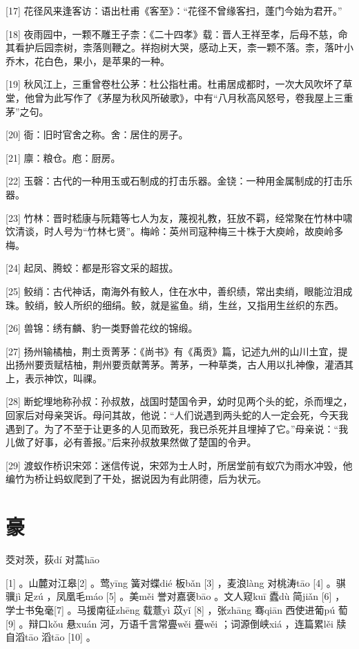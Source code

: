 \documentclass[12pt,UTF8]{ctexbook}
\begin{document}
[17] 花径风来逢客访：语出杜甫《客至》：“花径不曾缘客扫，蓬门今始为君开。”

[18] 夜雨园中，一颗不雕王子柰：《二十四孝》载：晋人王祥至孝，后母不慈，命其看护后园柰树，柰落则鞭之。祥抱树大哭，感动上天，柰一颗不落。柰，落叶小乔木，花白色，果小，是苹果的一种。

[19] 秋风江上，三重曾卷杜公茅：杜公指杜甫。杜甫居成都时，一次大风吹坏了草堂，他曾为此写作了《茅屋为秋风所破歌》，中有“八月秋高风怒号，卷我屋上三重茅”之句。

[20] 衙：旧时官舍之称。舍：居住的房子。

[21] 廪：粮仓。庖：厨房。

[22] 玉磬：古代的一种用玉或石制成的打击乐器。金铙：一种用金属制成的打击乐器。

[23] 竹林：晋时嵇康与阮籍等七人为友，蔑视礼教，狂放不羁，经常聚在竹林中啸饮清谈，时人号为“竹林七贤”。梅岭：英州司寇种梅三十株于大庾岭，故庾岭多梅。

[24] 起凤、腾蛟：都是形容文采的超拔。

[25] 鲛绡：古代神话，南海外有鲛人，住在水中，善织绩，常出卖绡，眼能泣泪成珠。鲛绡，鲛人所织的细绢。鲛，就是鲨鱼。绡，生丝，又指用生丝织的东西。

[26] 兽锦：绣有麟、豹一类野兽花纹的锦缎。

[27] 扬州输橘柚，荆土贡菁茅：《尚书》有《禹贡》篇，记述九州的山川土宜，提出扬州要贡赋桔柚，荆州要贡献菁茅。菁茅，一种草类，古人用以扎神像，灌酒其上，表示神饮，叫祼。

[28] 断蛇埋地称孙叔：孙叔敖，战国时楚国令尹，幼时见两个头的蛇，杀而埋之，回家后对母亲哭诉。母问其故，他说：“人们说遇到两头蛇的人一定会死，今天我遇到了。为了不至于让更多的人见而致死，我已杀死并且埋掉了它。”母亲说：“我儿做了好事，必有善报。”后来孙叔敖果然做了楚国的令尹。

[29] 渡蚁作桥识宋郊：迷信传说，宋郊为士人时，所居堂前有蚁穴为雨水冲毁，他编竹为桥让蚂蚁爬到了干处，据说因为有此阴德，后为状元。





\chapter{豪}


茭对茨，荻dí 对蒿hāo





[1] 。山麓对江皋[2] 。莺yīng 簧对蝶dié 板bǎn [3] ，麦浪làng 对桃涛tāo [4] 。骐骥jì 足zú ，凤凰毛máo [5] 。美měi 誉对嘉褒bāo 。文人窥kuī 蠹dù 简jiǎn [6] ，学士书兔毫[7] 。马援南征zhēng 载薏yì 苡yǐ [8] ，张zhāng 骞qiān 西使进葡pú 萄[9] 。辩口kǒu 悬xuán 河，万语千言常亹wěi 亹wěi ；词源倒峡xiá ，连篇累lěi 牍自滔tāo 滔tāo [10] 。
\end{document}
